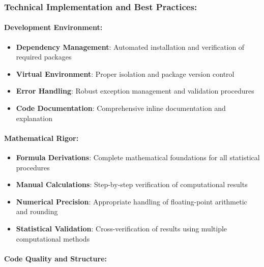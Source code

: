 \documentclass[11pt]{article}
\providecommand{\tightlist}{%
      \setlength{\itemsep}{0pt}\setlength{\parskip}{0pt}}
\begin{document}
\subsubsection{\texorpdfstring{\textbf{Technical Implementation and Best
Practices:}}{Technical Implementation and Best Practices:}}\label{technical-implementation-and-best-practices}

\paragraph{\texorpdfstring{\textbf{Development
Environment:}}{Development Environment:}}\label{development-environment}

\begin{itemize}
\tightlist
\item
  \textbf{Dependency Management}: Automated installation and
  verification of required packages
\item
  \textbf{Virtual Environment}: Proper isolation and package version
  control
\item
  \textbf{Error Handling}: Robust exception management and validation
  procedures
\item
  \textbf{Code Documentation}: Comprehensive inline documentation and
  explanation
\end{itemize}

\paragraph{\texorpdfstring{\textbf{Mathematical
Rigor:}}{Mathematical Rigor:}}\label{mathematical-rigor}

\begin{itemize}
\tightlist
\item
  \textbf{Formula Derivations}: Complete mathematical foundations for
  all statistical procedures
\item
  \textbf{Manual Calculations}: Step-by-step verification of
  computational results
\item
  \textbf{Numerical Precision}: Appropriate handling of floating-point
  arithmetic and rounding
\item
  \textbf{Statistical Validation}: Cross-verification of results using
  multiple computational methods
\end{itemize}

\paragraph{\texorpdfstring{\textbf{Code Quality and
Structure:}}{Code Quality and Structure:}}\label{code-quality-and-structure}
\end{document}
